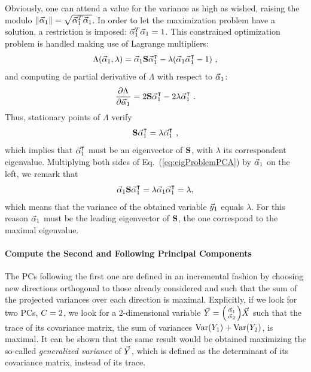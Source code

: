 Obviously, one can attend a value for the variance as high as wished, raising the modulo $\|\vec{\alpha}_1\| = \sqrt{\vec{\alpha}_1^T\vec{\alpha}_1}$. In order to let the maximization problem have a solution, a restriction is imposed: $\vec{\alpha}_1^T\vec{\alpha}_1 = 1$. 
This constrained  optimization problem is handled making use of Lagrange multipliers:
\begin{equation}
\Lambda(\vec{\alpha}_1, \lambda) = \vec{\alpha}_1\textbf{S}\vec{\alpha}_1^\intercal - \lambda(\vec{\alpha}_1\vec{\alpha}_1^\intercal-1) \mbox{ ,}
\end{equation}
and computing de partial derivative of $\Lambda$ with respect to $\vec{\alpha}_1$:
\begin{equation}
\frac{\partial\Lambda}{\partial\vec{\alpha}_1} = 2\textbf{S}\vec{\alpha}_1^\intercal-2\lambda\vec{\alpha}_1^\intercal \mbox{ .}
\end{equation}
Thus, stationary points of $\Lambda$ verify
\begin{equation}\label{eq:eigProblemPCA}
\textbf{S}\vec{\alpha}_1^\intercal = \lambda\vec{\alpha}_1^\intercal \mbox{ ,}
\end{equation}
which implies that $\vec{\alpha}_1^\intercal$ must be an eigenvector of $\textbf{S}$, with $\lambda$ its correspondent eigenvalue. Multiplying both sides of Eq.~(\ref{eq:eigProblemPCA}) by $\vec{\alpha}_1$ on the left, we remark that
\begin{equation}
\vec{\alpha}_1\textbf{S}\vec{\alpha}_1^\intercal = \lambda\vec{\alpha}_1\vec{\alpha}_1^\intercal = \lambda, 
\end{equation}
which means that the variance of the obtained variable $\vec{y}_1$ equals $\lambda$. For this reason $\vec{\alpha}_1$ must be the leading eigenvector of $\textbf{S}$, the one correspond to the maximal eigenvalue.

\paragraph*{Compute the Second and Following Principal Components}
The PCs following the first one are defined in an incremental fashion by choosing new directions orthogonal to those already considered and such that the sum of the projected variances over each direction is maximal. Explicitly, if we look for two PCs, \ie $C = 2$,  we look for a $2$-dimensional variable $\vec{Y} = \begin{psmallmatrix} \vec{\alpha}_1 \\ \vec{\alpha}_2 \end{psmallmatrix} \vec{X}$ such that the trace of its covariance matrix, \ie the sum of variances $\mathrm{Var}(Y_1)+\mathrm{Var}(Y_2)$, is maximal. It can be shown that the same result would be obtained maximizing the so-called \emph{generalized variance} of $\vec{Y}$, which is defined as the determinant of its covariance matrix, instead of its trace. \\

